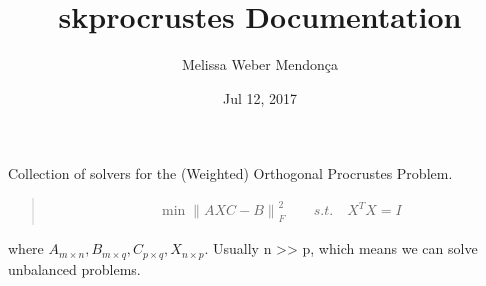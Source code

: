 \documentclass[a4paper,10pt,english]{sphinxmanual}
\title{skprocrustes Documentation}
\date{Jul 12, 2017}
\author{Melissa Weber Mendonça}
\begin{document}
\maketitle
\sphinxtableofcontents
{}\label{\detokenize{index::doc}}


Collection of solvers for the (Weighted) Orthogonal Procrustes Problem.
\begin{quote}
\begin{equation*}
\begin{split}\min  {\| AXC-B \|}_F^2 \qquad s. t. \quad X^TX=I\end{split}
\end{equation*}\end{quote}

where \(A_{m \times n}, B_{m \times q}, C_{p \times q},
X_{n \times p}\). Usually n \textgreater{}\textgreater{} p, which means we can solve unbalanced problems.
\end{document}

